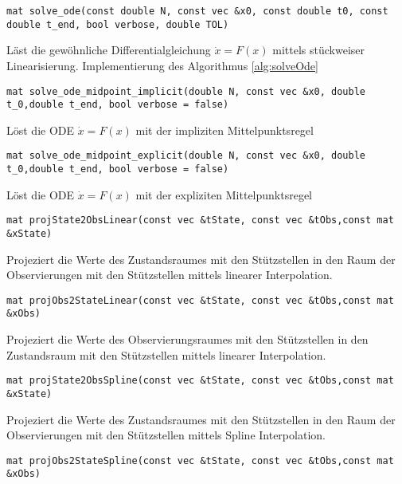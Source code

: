 \begin{lstlisting}[numbers=none]
mat solve_ode(const double N, const vec &x0, const double t0, const double t_end, bool verbose, double TOL)
\end{lstlisting}
Läst die gewöhnliche Differentialgleichung  $\dot x = F(x)$ mittels stückweiser Linearisierung. Implementierung des Algorithmus \ref{alg:solveOde}
\begin{lstlisting}[numbers=none]
mat solve_ode_midpoint_implicit(double N, const vec &x0, double t_0,double t_end, bool verbose = false)
\end{lstlisting}
Löst die ODE  $\dot x = F(x)$ mit der impliziten Mittelpunktsregel
\begin{lstlisting}[numbers=none]
mat solve_ode_midpoint_explicit(double N, const vec &x0, double t_0,double t_end, bool verbose = false)
\end{lstlisting}
Löst die ODE  $\dot x = F(x)$ mit der expliziten Mittelpunktsregel
\begin{lstlisting}[numbers=none]
mat projState2ObsLinear(const vec &tState, const vec &tObs,const mat &xState)
\end{lstlisting}
Projeziert die Werte  des Zustandsraumes mit den Stützstellen  in den Raum der Observierungen mit den Stützstellen  mittels linearer Interpolation.
\begin{lstlisting}[numbers=none]
mat projObs2StateLinear(const vec &tState, const vec &tObs,const mat &xObs)
\end{lstlisting}
Projeziert die Werte  des Observierungsraumes mit den Stützstellen  in den Zustandsraum mit den Stützstellen  mittels linearer Interpolation.
\begin{lstlisting}[numbers=none]
mat projState2ObsSpline(const vec &tState, const vec &tObs,const mat &xState)
\end{lstlisting}
Projeziert die Werte  des Zustandsraumes mit den Stützstellen  in den Raum der Observierungen mit den Stützstellen  mittels Spline Interpolation.
\begin{lstlisting}[numbers=none]
mat projObs2StateSpline(const vec &tState, const vec &tObs,const mat &xObs)
\end{lstlisting}

